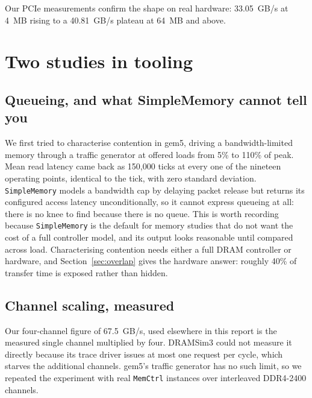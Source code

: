 \documentclass[10pt,a4paper]{article}
\begin{document}
Our PCIe measurements confirm the shape on real hardware: 33.05~GB/s at 4~MB
rising to a 40.81~GB/s plateau at 64~MB and above.

\section{Two studies in tooling}

\subsection{Queueing, and what SimpleMemory cannot tell you}

We first tried to characterise contention in gem5, driving a bandwidth-limited
memory through a traffic generator at offered loads from 5\% to 110\% of peak.
Mean read latency came back as 150{,}000 ticks at every one of the nineteen
operating points, identical to the tick, with zero standard deviation.
\texttt{SimpleMemory} models a bandwidth cap by delaying packet release but
returns its configured access latency unconditionally, so it cannot express
queueing at all: there is no knee to find because there is no queue. This is
worth recording because \texttt{SimpleMemory} is the default for memory studies
that do not want the cost of a full controller model, and its output looks
reasonable until compared across load. Characterising contention needs either a
full DRAM controller or hardware, and Section~\ref{sec:overlap} gives the
hardware answer: roughly 40\% of transfer time is exposed rather than hidden.

\subsection{Channel scaling, measured}
\label{sec:channels}

Our four-channel figure of 67.5~GB/s, used elsewhere in this report is
the measured single channel multiplied by four. DRAMSim3 could not measure it
directly because its trace driver issues at most one request per cycle, which
starves the additional channels. gem5's traffic generator has no such limit, so we
repeated the experiment with real \texttt{MemCtrl} instances over interleaved
DDR4-2400 channels.
\end{document}
